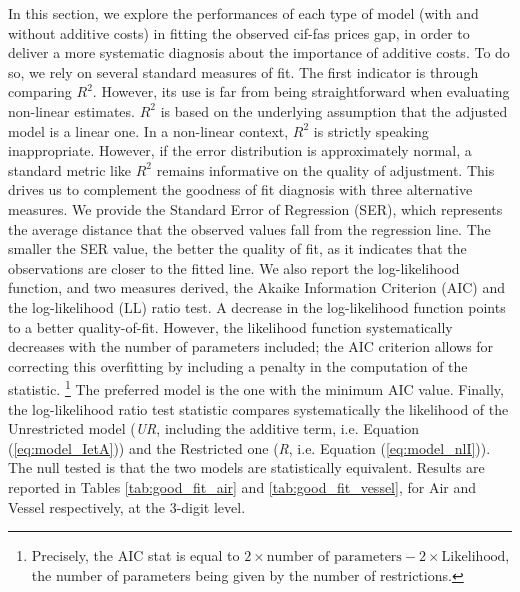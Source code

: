 \documentclass[a4paper,11pt]{article}
\begin{document}
In this section, we explore the performances of each type of model (with and without additive costs) in fitting the observed cif-fas prices gap, in order to deliver a more systematic diagnosis about the importance of additive costs.
To do so, we rely on several standard measures of fit.
The first indicator is through comparing $R^{2}$.
However, its use is far from being straightforward when evaluating non-linear estimates.
$R^2$ is based on the underlying assumption that the adjusted model is a linear one.
In a non-linear context, $R^2$ is strictly speaking inappropriate.
However, if the error distribution is approximately normal, a standard metric like $R^2$ remains informative on the quality of adjustment.
This drives us to complement the goodness of fit diagnosis with three alternative measures.
We provide the Standard Error of Regression (SER), which represents the average distance that the observed values fall from the regression line.
The smaller the SER value, the better the quality of fit, as it indicates that the observations are closer to the fitted line.
We also report the log-likelihood function, and two measures derived, the Akaike Information Criterion (AIC) and the log-likelihood (LL) ratio test.
A decrease in the log-likelihood function points to a better quality-of-fit.
However, the likelihood function systematically decreases with the number of parameters included; the AIC criterion allows for correcting this overfitting by including a penalty in the computation of the statistic. \footnote{Precisely, the AIC stat is equal to $2 \times \textrm{number of parameters} - 2 \times \textrm{Likelihood} $, the number of parameters being given by the number of restrictions.}
The preferred model is the one with the minimum AIC value.
Finally, the log-likelihood ratio test statistic compares systematically the likelihood of the Unrestricted model (\emph{UR}, including the additive term, i.e.
Equation (\ref{eq:model_IetA})) and the Restricted one (\emph{R}, i.e.
Equation (\ref{eq:model_nlI})).
The null tested is that the two models are statistically equivalent.
Results are reported in Tables \ref{tab:good_fit_air} and \ref{tab:good_fit_vessel}, for Air and Vessel respectively, at the 3-digit level.
\end{document}
